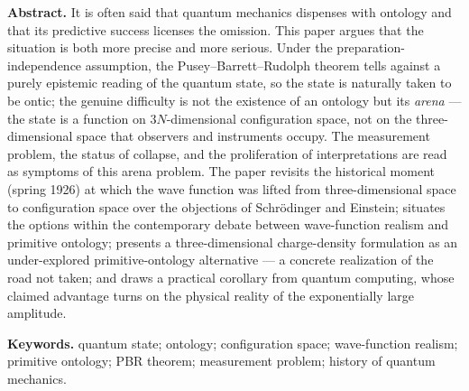 \documentclass[11pt]{article}
\begin{document}
\noindent\textbf{Abstract.}
It is often said that quantum mechanics dispenses with ontology and that its predictive success licenses the
omission. This paper argues that the situation is both more precise and more serious. Under the
preparation-independence assumption, the Pusey--Barrett--Rudolph theorem tells against a purely epistemic reading
of the quantum state, so the state is naturally taken to be ontic; the genuine difficulty is not the existence of
an ontology but its \emph{arena} --- the state is a function on $3N$-dimensional configuration space, not on the
three-dimensional space that observers and instruments occupy. The measurement problem, the status of collapse,
and the proliferation of interpretations are read as symptoms of this arena problem. The paper revisits the
historical moment (spring 1926) at which the wave function was lifted from three-dimensional space to
configuration space over the objections of Schr\"odinger and Einstein; situates the options within the
contemporary debate between wave-function realism and primitive ontology; presents a three-dimensional
charge-density formulation as an under-explored primitive-ontology alternative --- a concrete realization of the
road not taken; and draws a practical corollary from quantum computing, whose claimed advantage turns on the
physical reality of the exponentially large amplitude.

\vspace{1em}

\noindent\textbf{Keywords.} quantum state; ontology; configuration space; wave-function realism; primitive
ontology; PBR theorem; measurement problem; history of quantum mechanics.
\end{document}
